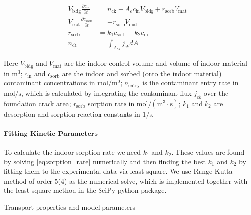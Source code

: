 \begin{align}
  V_\mathrm{bldg} \frac{\partial c_\mathrm{in}}{\partial t} &= n_\mathrm{ck} - A_e c_\mathrm{in} V_\mathrm{bldg} + r_\mathrm{sorb} V_\mathrm{mat}\label{eq:cstr} \\
  V_\mathrm{mat} \frac{\partial c_\mathrm{sorb}}{\partial t} &= -r_\mathrm{sorb} V_\mathrm{mat}\label{eq:sorbed_concentration} \\
  r_\mathrm{sorb} &= k_1 c_\mathrm{sorb} - k_2 c_\mathrm{in}\label{eq:sorption_rate}\\
  n_\mathrm{ck} &= \int_{A_{ck}} j_{ck} dA
\end{align}

Here $V_\mathrm{bldg}$ and $V_\mathrm{mat}$ are the indoor control volume and volume of indoor material in $\mathrm{m^3}$;
$c_\mathrm{in}$ and $c_\mathrm{sorb}$ are the indoor and sorbed (onto the indoor material) contaminant concentrations in $\mathrm{mol/m^3}$;
$n_\mathrm{entry}$ is the contaminant entry rate in $\mathrm{mol/s}$, which is calculated by integrating the contaminant flux $j_{ck}$ over the foundation crack area;
$r_\mathrm{sorb}$ sorption rate in $\mathrm{mol/(m^3 \cdot s)}$;
$k_1$ and $k_2$ are desorption and sorption reaction constants in $\mathrm{1/s}$.\par %

\paragraph{Fitting Kinetic Parameters}

To calculate the indoor sorption rate we need $k_1$ and $k_2$.
These values are found by solving \eqref{eq:sorption_rate} numerically and then finding the best $k_1$ and $k_2$ by fitting them to the experimental data via least square.
We use Runge-Kutta method of order 5(4) as the numerical solve, which is implemented together with the least square method in the SciPy python package\cite{jones_scipy_2011}.


\begin{table}
  \caption{Transport properties and model parameters}
  \label{tbl:model}
\end{table}
